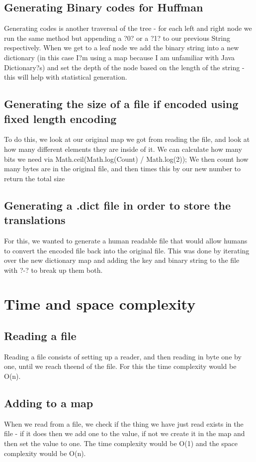 \documentclass[11pt, oneside]{amsart}
\begin{document}
\subsection{Generating Binary codes for Huffman}
Generating codes is another traversal of the tree - for each left and right node we run the same method but appending a ?0? or a ?1? to our previous String respectively. When we get to a leaf node we add the binary string into a new dictionary (in this case I?m using a map because I am unfamiliar with Java Dictionary?s) and set the depth of the node based on the length of the string - this will help with statistical generation.
\subsection{Generating the size of a file if encoded using fixed length encoding}
To do this, we look at our original map we got from reading the file, and look at how many different elements they are inside of it. We can calculate how many bits we need via Math.ceil(Math.log(Count) / Math.log(2)); We then count how many bytes are in the original file, and then times this by our new number to return the total size
\subsection{Generating a .dict file in order to store the translations}
For this, we wanted to generate a human readable file that would allow humans to convert the encoded file back into the original file. This was done by iterating over the new dictionary map and adding the key and binary string to the file with ?-? to break up them both.
\section{Time and space complexity}
\subsection{Reading a file}
Reading a file consists of setting up a reader, and then reading in byte one by one, until we reach theend of the file. For this the time complexity would be O(n).
\subsection{Adding to a map}
When we read from a file, we check if the thing we have just read exists in the file - if it does then we add one to the value, if not we create it in the map and then set the value to one. The time complexity would be O(1) and the space complexity would be O(n).
\end{document}
